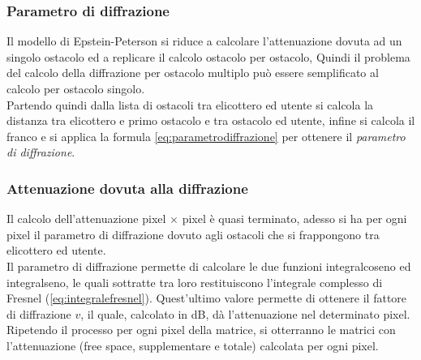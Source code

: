 \subsubsection{Parametro di diffrazione}
Il modello di Epstein-Peterson si riduce a calcolare l'attenuazione dovuta ad un singolo ostacolo ed a replicare il calcolo ostacolo per 
ostacolo, Quindi il problema del calcolo della diffrazione per ostacolo multiplo può essere semplificato al calcolo per ostacolo singolo. \\
Partendo quindi dalla lista di ostacoli tra elicottero ed utente si calcola la distanza tra elicottero e primo ostacolo e tra ostacolo 
ed utente, infine si calcola il franco e si applica la formula \ref{eq:parametrodiffrazione} per ottenere il \emph{parametro di diffrazione}.

\subsubsection{Attenuazione dovuta alla diffrazione}
Il calcolo dell'attenuazione pixel $\times$ pixel è quasi terminato, adesso si ha per ogni pixel il parametro di diffrazione dovuto agli
ostacoli che si frappongono tra elicottero ed utente. \\
Il parametro di diffrazione permette di calcolare le due funzioni integralcoseno ed integralseno, le quali sottratte tra loro restituiscono
l'integrale complesso di Fresnel (\ref{eq:integralefresnel}).
Quest'ultimo valore permette di ottenere il fattore di diffrazione $v$, il quale, calcolato in dB, dà l'attenuazione nel determinato
pixel. \\
Ripetendo il processo per ogni pixel della matrice, si otterranno le matrici con l'attenuazione (free space, supplementare e totale)
calcolata per ogni pixel.


